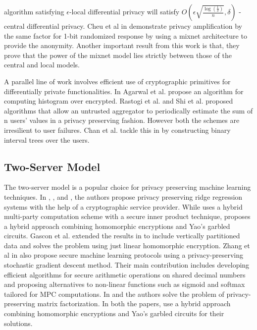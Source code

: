 algorithm satisfying $\epsilon$-local differential privacy will satisfy $O(\epsilon\sqrt{\frac{\log(\frac{1}{\delta})}{n}},\delta)$ -central differential
privacy. Cheu et al in \cite{mixnets} demonstrate privacy amplification by the same factor for 1-bit randomized response by using a mixnet architecture to provide the anonymity. Another important result from this work is that, they prove that the power of the mixnet model lies strictly between those of the central and local
models.
\par A parallel line of work involves efficient use of cryptographic primitives for differentially private
functionalities. In   Agarwal et al. propose an algorithm for computing histogram over encrypted. Rastogi et al. \cite{Rastogi} and
Shi et al. \cite{Shi} proposed algorithms that allow an untrusted aggregator to periodically
estimate the sum of n users’ values in a  privacy preserving fashion. However both the schemes are irresilient to user failures. Chan et al. tackle this in \cite{Shi2} by constructing binary interval trees over the users.
\subsection{Two-Server Model}
The two-server model is a popular choice for privacy preserving machine learning techniques. In \cite{Boneh1}, \cite{LReg}, \cite{Ver} and \cite{Ridge2}, the authors propose privacy preserving ridge regression systems with the help of a cryptographic service provider. While \cite{Ridge2} uses a hybrid multi-party computation scheme with a secure inner product technique, \cite{Boneh1} proposes a hybrid approach combining homomorphic encryptions and Yao's garbled circuits. Gascon et al. \cite{Ver} extended the results in \cite{Boneh1} to include vertically partitioned data and \cite{LReg} solves the problem using just linear homomorphic encryption.  Zhang et al in \cite{secureML} also propose secure machine learning protocols using a privacy-preserving stochastic gradient descent method. Their main contribution includes developing efficient algorithms for secure arithmetic
operations on shared decimal numbers and proposing alternatives to non-linear
functions such as sigmoid and softmax tailored for MPC computations. 
In \cite{Boneh2} and \cite{Matrix2} the authors solve the problem of privacy-preserving matrix factorization. In both the papers, use a hybrid approach combining homomorphic encryptions and Yao's garbled circuits for their solutions. 

